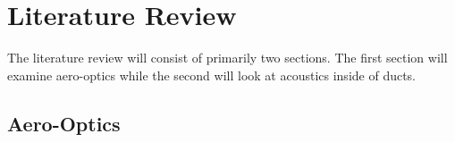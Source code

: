
\chapter{Literature Review}
\label{chap:02_lit_review}
The literature review will consist of primarily two sections.
The first section will examine aero-optics while the second will look at acoustics inside of ducts.
\section{Aero-Optics}

